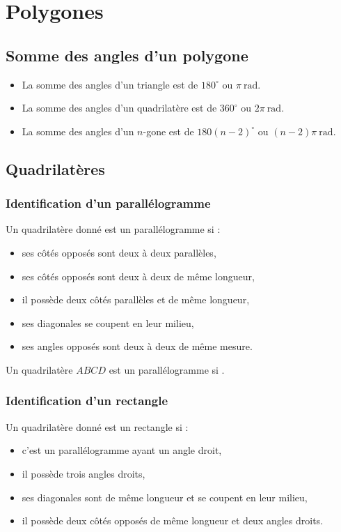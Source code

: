 \providecommand{\rad}{\mathrm{rad}}
\section{Polygones}
		\subsection{Somme des angles d'un polygone}
		\begin{itemize}
			\item La somme des angles d'un triangle est de $180^\circ$ ou $\pi~\rad$.
			\item La somme des angles d'un quadrilat\`ere est de $360^\circ$ ou $2\pi~\rad$.
			\item La somme des angles d'un $n$-gone est de $180(n-2)^\circ$ ou $(n-2)\pi~\rad$.
		\end{itemize}
		\subsection{Quadrilat\`eres}
			\subsubsection{Identification d'un parall\'elogramme}
			Un quadrilat\`ere donn\'e est un parall\'elogramme si : 
			\begin{itemize}
				\item ses c\^ot\'es oppos\'es sont deux \`a deux parall\`eles,
				\item ses c\^ot\'es oppos\'es sont deux \`a deux de m\^eme longueur,
				\item il poss\`ede deux c\^ot\'es parall\`eles et de m\^eme longueur,
				\item ses diagonales se coupent en leur milieu,
				\item ses angles oppos\'es sont deux \`a deux de m\^eme mesure.
			\end{itemize}
			Un quadrilat\`ere $ABCD$ est un parall\'elogramme si .
			\subsubsection{Identification d'un rectangle}
			Un quadrilat\`ere donn\'e est un rectangle si : 
			\begin{itemize}
				\item c'est un parall\'elogramme ayant un angle droit,
				\item il poss\`ede trois angles droits,
				\item ses diagonales sont de m\^eme longueur et se coupent en leur milieu,
					\item il poss\`ede deux c\^ot\'es oppos\'es de m\^eme longueur et deux angles droits.
			\end{itemize}

